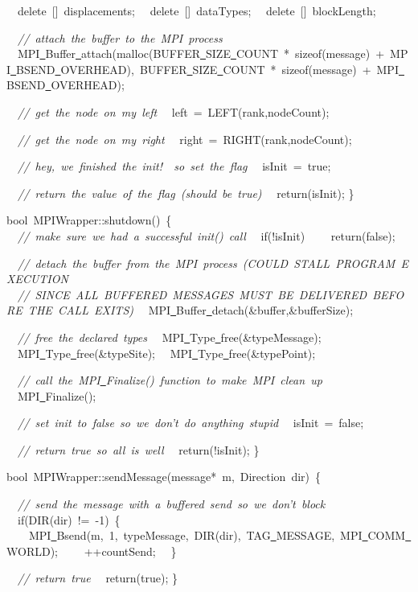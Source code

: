 {\ \ delete\ []\ displacements;
\ \ delete\ []\ dataTypes;
\ \ delete\ []\ blockLength;

\ \ \textsl{//\ attach\ the\ buffer\ to\ the\ MPI\ process}
\ \ MPI\underline\ Buffer\underline\ attach(malloc(BUFFER\underline\ SIZE\underline\ COUNT\ *\ sizeof(message)\ +\ MPI\underline\ BSEND\underline\ OVERHEAD),\ BUFFER\underline\ SIZE\underline\ COUNT\ *\ sizeof(message)\ +\ MPI\underline\ BSEND\underline\ OVERHEAD);

\ \ \textsl{//\ get\ the\ node\ on\ my\ left}
\ \ left\ =\ LEFT(rank,nodeCount);

\ \ \textsl{//\ get\ the\ node\ on\ my\ right}
\ \ right\ =\ RIGHT(rank,nodeCount);

\ \ \textsl{//\ hey,\ we\ finished\ the\ init!\ \ so\ set\ the\ flag}
\ \ isInit\ =\ true;

\ \ \textsl{//\ return\ the\ value\ of\ the\ flag\ (should\ be\ true)}
\ \ return(isInit);
\}

bool\ MPIWrapper::shutdown()\ \{
\ \ \textsl{//\ make\ sure\ we\ had\ a\ successful\ init()\ call}
\ \ if(!isInit)
\ \ \ \ return(false);

\ \ \textsl{//\ detach\ the\ buffer\ from\ the\ MPI\ process\ (COULD\ STALL\ PROGRAM\ EXECUTION}
\ \ \textsl{//\ SINCE\ ALL\ BUFFERED\ MESSAGES\ MUST\ BE\ DELIVERED\ BEFORE\ THE\ CALL\ EXITS)}
\ \ MPI\underline\ Buffer\underline\ detach(\&buffer,\&bufferSize);

\ \ \textsl{//\ free\ the\ declared\ types}
\ \ MPI\underline\ Type\underline\ free(\&typeMessage);
\ \ MPI\underline\ Type\underline\ free(\&typeSite);
\ \ MPI\underline\ Type\underline\ free(\&typePoint);

\ \ \textsl{//\ call\ the\ MPI\underline\ Finalize()\ function\ to\ make\ MPI\ clean\ up}
\ \ MPI\underline\ Finalize();

\ \ \textsl{//\ set\ init\ to\ false\ so\ we\ don't\ do\ anything\ stupid}
\ \ isInit\ =\ false;

\ \ \textsl{//\ return\ true\ so\ all\ is\ well}
\ \ return(!isInit);
\}

bool\ MPIWrapper::sendMessage(message*\ m,\ Direction\ dir)\ \{

\ \ \textsl{//\ send\ the\ message\ with\ a\ buffered\ send\ so\ we\ don't\ block}
\ \ if(DIR(dir)\ !=\ -{}1)\ \{
\ \ \ \ MPI\underline\ Bsend(m,\ 1,\ typeMessage,\ DIR(dir),\ TAG\underline\ MESSAGE,\ MPI\underline\ COMM\underline\ WORLD);
\ \ \ \ ++countSend;
\ \ \}

\ \ \textsl{//\ return\ true}
\ \ return(true);
\}

}
